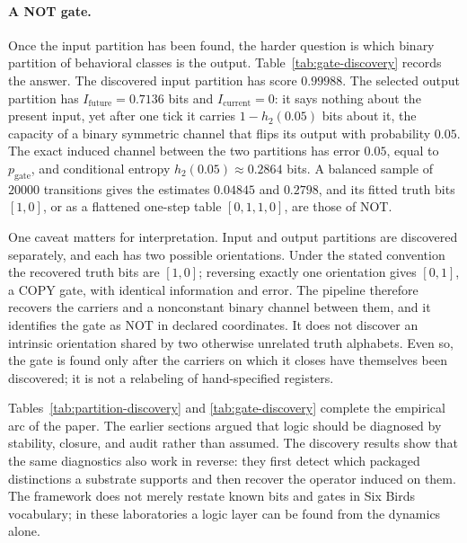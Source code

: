 \begin{table}[t]
    \centering
    \caption{Recovered NOT gate in the NOT laboratory (barrier \(6\), \(p_{\mathrm{gate}}=0.05\), \(\tau=1\)). The exact column is computed from the kernel between the discovered input and output partitions; the sample column fits a one-input gate to \(20000\) transitions drawn equally from the two input classes, with starting microstates uniform within each class. Truth bits list the output for inputs \(0\) and \(1\) under the convention that each partition labels the class containing microstate~\(0\) as \(0\).}
    \label{tab:gate-discovery}
    
\end{table}

\paragraph{A NOT gate.}
Once the input partition has been found, the harder question is which binary partition of behavioral classes is the output. Table~\ref{tab:gate-discovery} records the answer. The discovered input partition has score \(0.99988\). The selected output partition has \(I_{\mathrm{future}}=0.7136\) bits and \(I_{\mathrm{current}}=0\): it says nothing about the present input, yet after one tick it carries \(1-h_2(0.05)\) bits about it, the capacity of a binary symmetric channel that flips its output with probability \(0.05\). The exact induced channel between the two partitions has error \(0.05\), equal to \(p_{\mathrm{gate}}\), and conditional entropy \(h_2(0.05)\approx0.2864\) bits. A balanced sample of \(20000\) transitions gives the estimates \(0.04845\) and \(0.2798\), and its fitted truth bits \([1,0]\), or as a flattened one-step table \([0,1,1,0]\), are those of NOT.

One caveat matters for interpretation. Input and output partitions are discovered separately, and each has two possible orientations. Under the stated convention the recovered truth bits are \([1,0]\); reversing exactly one orientation gives \([0,1]\), a COPY gate, with identical information and error. The pipeline therefore recovers the carriers and a nonconstant binary channel between them, and it identifies the gate as NOT in declared coordinates. It does not discover an intrinsic orientation shared by two otherwise unrelated truth alphabets. Even so, the gate is found only after the carriers on which it closes have themselves been discovered; it is not a relabeling of hand-specified registers.

Tables~\ref{tab:partition-discovery} and \ref{tab:gate-discovery} complete the empirical arc of the paper. The earlier sections argued that logic should be diagnosed by stability, closure, and audit rather than assumed. The discovery results show that the same diagnostics also work in reverse: they first detect which packaged distinctions a substrate supports and then recover the operator induced on them. The framework does not merely restate known bits and gates in Six Birds vocabulary; in these laboratories a logic layer can be found from the dynamics alone.
